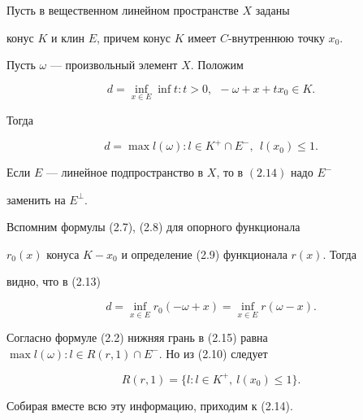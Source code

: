  


\begin{thms} 


Пусть в вещественном линейном пространстве $X$ заданы 


конус $K$ и клин $E$, причем конус $K$ имеет $C$-внутреннюю точку $x_0$. 


Пусть $\omega$ --- произвольный элемент $X$. Положим 


\begin{equation} 


d=\inf_{x\in E}\inf t:t>0, 


\ \ -\omega+x+t x_0\in K. 


\end{equation} 


Тогда 


\begin{equation} 


d=\max l(\omega):l\in K^+\cap E^-,\ \ l(x_0)\le1. 


\end{equation} 


Если $E$ --- линейное подпространство в $X$, то в $(2.14)$ надо $E^-$


заменить на $E^\bot$. 


\end{thms} 


 


\begin{pf} 


Вспомним формулы (2.7), (2.8) для опорного функционала 


$r_0(x)$ конуса $K-x_0$ и определение (2.9) функционала $r(x)$. Тогда 


видно, что в (2.13)


\begin{equation} 


d=\inf_{x\in E}r_0(-\omega+x)=\inf_{x\in E}r(\omega-x). 


\end{equation} 


Согласно формуле (2.2) нижняя грань в (2.15) равна $\max l(\omega):l\in 


R(r,1)\cap E^-$. Но из (2.10) следует


$$ 


R(r,1)=\{l:l\in K^+,\ l(x_0)\le1\}. 


$$ 


Собирая вместе всю эту информацию, приходим к (2.14). 


\end{pf} 


